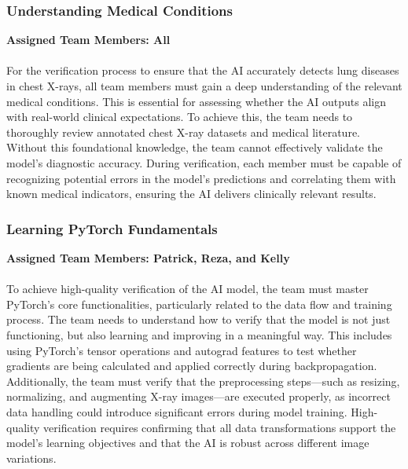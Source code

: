 \documentclass[12pt, titlepage]{article}
\begin{document}

\subsubsection{Understanding Medical Conditions}
\textbf{Assigned Team Members: All} \\\\
For the verification process to ensure that the AI accurately detects lung diseases in chest X-rays, all team members must gain a deep understanding of the relevant medical conditions. This is essential for assessing whether the AI outputs align with real-world clinical expectations. To achieve this, the team needs to thoroughly review annotated chest X-ray datasets and medical literature. Without this foundational knowledge, the team cannot effectively validate the model’s diagnostic accuracy. During verification, each member must be capable of recognizing potential errors in the model’s predictions and correlating them with known medical indicators, ensuring the AI delivers clinically relevant results.
\subsubsection{Learning PyTorch Fundamentals}
\textbf{Assigned Team Members: Patrick, Reza, and Kelly}\\\\
To achieve high-quality verification of the AI model, the team must master PyTorch’s core functionalities, particularly related to the data flow and training process. The team needs to understand how to verify that the model is not just functioning, but also learning and improving in a meaningful way. This includes using PyTorch’s tensor operations and autograd features to test whether gradients are being calculated and applied correctly during backpropagation. Additionally, the team must verify that the preprocessing steps—such as resizing, normalizing, and augmenting X-ray images—are executed properly, as incorrect data handling could introduce significant errors during model training. High-quality verification requires confirming that all data transformations support the model’s learning objectives and that the AI is robust across different image variations.
\end{document}
